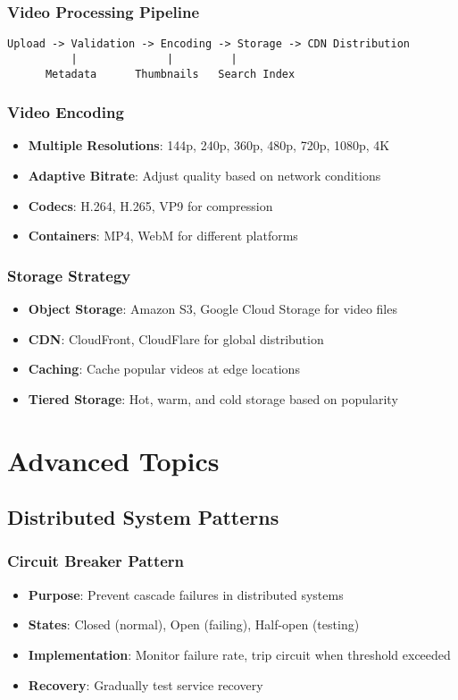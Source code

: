 \documentclass[10pt,a4paper]{article}
\begin{document}
\subsubsection{Video Processing Pipeline}
\begin{verbatim}
Upload -> Validation -> Encoding -> Storage -> CDN Distribution
          |              |         |
      Metadata      Thumbnails   Search Index
\end{verbatim}

\subsubsection{Video Encoding}
\begin{itemize}
\item \textbf{Multiple Resolutions}: 144p, 240p, 360p, 480p, 720p, 1080p, 4K
\item \textbf{Adaptive Bitrate}: Adjust quality based on network conditions
\item \textbf{Codecs}: H.264, H.265, VP9 for compression
\item \textbf{Containers}: MP4, WebM for different platforms
\end{itemize}

\subsubsection{Storage Strategy}
\begin{itemize}
\item \textbf{Object Storage}: Amazon S3, Google Cloud Storage for video files
\item \textbf{CDN}: CloudFront, CloudFlare for global distribution
\item \textbf{Caching}: Cache popular videos at edge locations
\item \textbf{Tiered Storage}: Hot, warm, and cold storage based on popularity
\end{itemize}

\section{Advanced Topics}

\subsection{Distributed System Patterns}

\subsubsection{Circuit Breaker Pattern}
\begin{itemize}
\item \textbf{Purpose}: Prevent cascade failures in distributed systems
\item \textbf{States}: Closed (normal), Open (failing), Half-open (testing)
\item \textbf{Implementation}: Monitor failure rate, trip circuit when threshold exceeded
\item \textbf{Recovery}: Gradually test service recovery
\end{itemize}
\end{document}

